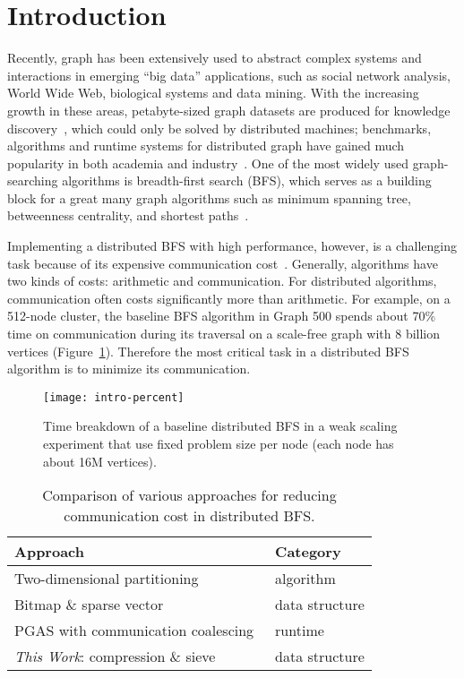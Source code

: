 \documentclass[conference]{IEEEtran}
\begin{document}
\section{Introduction}
\label{sec:intro}
Recently, graph has been extensively used to abstract complex systems and
interactions in emerging ``big data'' applications, such as social network
analysis, World Wide Web, biological systems and data mining. With the
increasing growth in these areas, petabyte-sized graph datasets are produced
for knowledge discovery~\cite{Bader:2007,Lumsdaine:2007}, which could only be
solved by distributed machines; benchmarks, algorithms and runtime systems for
distributed graph have gained much popularity in both academia and
industry~\cite{graph500,Yoo:2005,Buluc:2011,Malewicz:2009}. One of the most
widely used graph-searching algorithms is breadth-first search (BFS), which
serves as a building block for a great many graph algorithms such as minimum
spanning tree, betweenness centrality, and shortest
paths~\cite{Chazelle:2000,tan-cyclops64,bc-brandes,Cherkassky:1996}.

Implementing a distributed BFS with high performance, however, is a
challenging task because of its expensive communication
cost~\cite{Chan05cgmgraph,Lumsdaine:2007}. Generally, algorithms have two
kinds of costs: arithmetic and communication. For distributed algorithms,
communication often costs significantly more than arithmetic. For example, on
a 512-node cluster, the baseline BFS algorithm in Graph 500 spends about 70\%
time on communication during its traversal on a scale-free graph with 8
billion vertices (Figure~\ref{fig:intro-percent}).  Therefore the most
critical task in a distributed BFS algorithm is to minimize its communication.

\begin{figure}[t]
  \centering
  \texttt{[image: intro-percent]}
  \caption{Time breakdown of a baseline distributed BFS in a weak scaling
    experiment that use fixed problem size per node (each node has about 16M
    vertices).}
  \label{fig:intro-percent}
\end{figure}
\begin{table}[t]
  \caption{Comparison of various approaches for reducing communication cost in
    distributed BFS.}
  \label{table:comparison}
\begin{center}
     \begin{tabularx}{0.45\textwidth}{ll}
       \toprule Approach & Category \\
       \midrule
       Two-dimensional partitioning~\cite{Yoo:2005,Buluc:2011} & algorithm \\
       Bitmap \& sparse vector~\cite{graph500,Buluc:2011} & data structure \\
       PGAS with communication coalescing~\cite{Cong:2010} & runtime \\
       \midrule
       \textit{This Work}: compression \& sieve & data structure \\
       \bottomrule
    \end{tabularx}
  \end{center}
\end{table}
\end{document}
